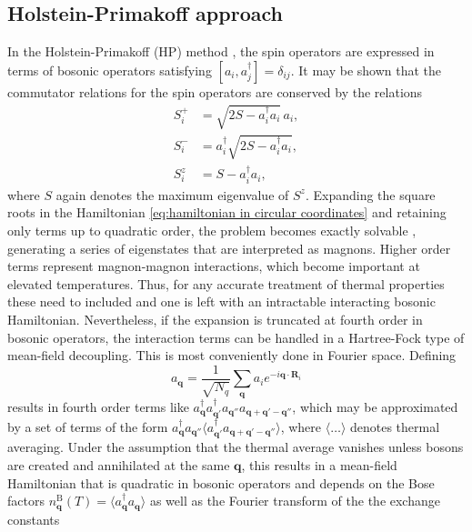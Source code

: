 \documentclass[aps,prb,reprint,floatfix,superscriptaddress]{revtex4-2}
\begin{document}
\subsection{Holstein-Primakoff approach}
In the Holstein-Primakoff (HP) method \cite{holsteinprimakoff1940}, the spin operators are expressed in terms of bosonic operators satisfying $[a_i,a^\dag_j]=\delta_{ij}$. It may be shown that the commutator relations for the spin operators are conserved by the relations
\begin{subequations}
\begin{align}
        S_i^+ & = \sqrt{2S-a_i^\dagger a_i}\, a_i \label{hp_spin+},\\
        S_i^- & = a_i^\dagger \sqrt{2S-a_i^\dagger a_i} \label{hp_spin-},\\
        S_i^z & = S - a_i^\dagger a_i \label{hp_spinz},
\end{align}
\end{subequations}
where $S$ again denotes the maximum eigenvalue of $S^z$. Expanding the square roots in the Hamiltonian \eqref{eq:hamiltonian in circular coordinates} and retaining only terms up to quadratic order, the problem becomes exactly solvable \cite{Toth2015}, generating a series of eigenstates that are interpreted as magnons. Higher order terms represent magnon-magnon interactions, which become important at elevated temperatures. Thus, for any accurate treatment of thermal properties these need to included and one is left with an intractable interacting bosonic Hamiltonian. Nevertheless, if the expansion is truncated at fourth order in bosonic operators, the interaction terms can be handled in a Hartree-Fock type of mean-field decoupling. This is most conveniently done in Fourier space. Defining
\begin{equation}\label{hp-q-transform}
   a_{\mathbf{q}} = \frac{1}{\sqrt{N_q}}\sum_{\mathbf{q}} a_i e^{-i\mathbf{q}\cdot \mathbf{R}_{i}}
\end{equation}
results in fourth order terms like $a^\dag_\mathbf{q}a^\dag_\mathbf{q'}a_\mathbf{q''}a_\mathbf{q+q'-q''}$, which may be approximated by a set of terms of the form $a^\dag_\mathbf{q}a_\mathbf{q''}\langle a^\dag_\mathbf{q'}a_\mathbf{q+q'-q''}\rangle$, where $\langle\ldots\rangle$ denotes thermal averaging. Under the assumption that the thermal average vanishes unless bosons are created and annihilated at the same $\mathbf{q}$, this results in a mean-field Hamiltonian that is quadratic in bosonic operators and depends on the Bose factors $n_\mathbf{q}^\mathrm{B}(T)=\langle a^\dag_\mathbf{q}a_\mathbf{q}\rangle$ as well as the Fourier transform of the the exchange constants
\end{document}
